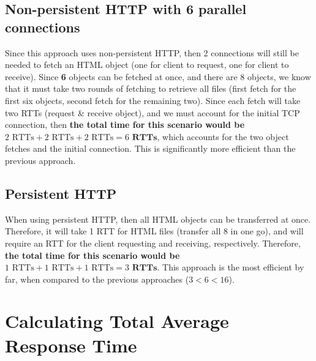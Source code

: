 \documentclass{article}
\begin{document}
\subsection{Non-persistent HTTP with 6 parallel connections}
Since this approach uses non-persistent HTTP, then 2 connections will still be needed to fetch an HTML object (one for client to request, one for client to receive). Since \textbf{6} objects can be fetched at once, and there are 8 objects, we know that it must take two rounds of fetching to retrieve all files (first fetch for the first six objects, second fetch for the remaining two). Since each fetch will take two RTTs (request \& receive object), and we must account for the initial TCP connection, then \textbf{the total time for this scenario would be $2 \text{ RTTs}+ 2 \text{ RTTs} + 2 \text{ RTTs} = 6 \textbf{ RTTs}$}, which accounts for the two object fetches and the initial connection. This is significantly more efficient than the previous approach.
\subsection{Persistent HTTP}
When using persistent HTTP, then all HTML objects can be transferred at once. Therefore, it will take 1 RTT for HTML files (transfer all 8 in one go), and will require an RTT for the client requesting and receiving, respectively. Therefore, \textbf{the total time for this scenario would be $1 \text{ RTTs}+ 1 \text{ RTTs} + 1 \text{ RTTs} = 3 \textbf{ RTTs}$}. This approach is the most efficient by far, when compared to the previous approaches ($3 < 6 < 16$).

\section{Calculating Total Average Response Time}
\end{document}
